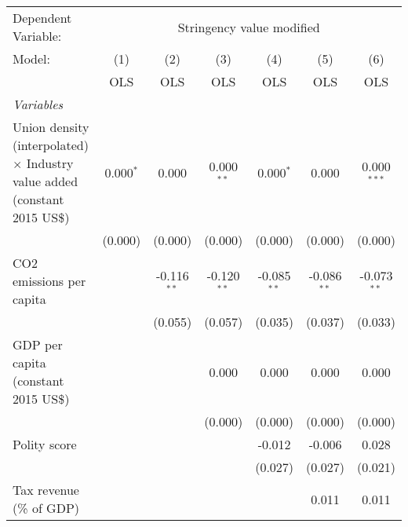 
\begingroup
\centering
\begin{tabular}{lcccccc}
   \toprule
   Dependent Variable: & \multicolumn{6}{c}{Stringency value modified}\\
   Model:                                                                            & (1)         & (2)           & (3)           & (4)           & (5)           & (6)\\  
                                                                                     &  OLS        & OLS           & OLS           & OLS           & OLS           & OLS\\  
   \midrule
   \emph{Variables}\\
   Union density (interpolated) $\times$ Industry value added (constant 2015 US\$)   & 0.000$^{*}$ & 0.000         & 0.000$^{**}$  & 0.000$^{*}$   & 0.000         & 0.000$^{***}$\\   
                                                                                     & (0.000)     & (0.000)       & (0.000)       & (0.000)       & (0.000)       & (0.000)\\   
   CO2 emissions per capita                                                          &             & -0.116$^{**}$ & -0.120$^{**}$ & -0.085$^{**}$ & -0.086$^{**}$ & -0.073$^{**}$\\   
                                                                                     &             & (0.055)       & (0.057)       & (0.035)       & (0.037)       & (0.033)\\   
   GDP per capita (constant 2015 US\$)                                               &             &               & 0.000         & 0.000         & 0.000         & 0.000\\   
                                                                                     &             &               & (0.000)       & (0.000)       & (0.000)       & (0.000)\\   
   Polity score                                                                      &             &               &               & -0.012        & -0.006        & 0.028\\   
                                                                                     &             &               &               & (0.027)       & (0.027)       & (0.021)\\   
   Tax revenue (\% of GDP)                                                           &             &               &               &               & 0.011         & 0.011\\   

\end{tabular}
